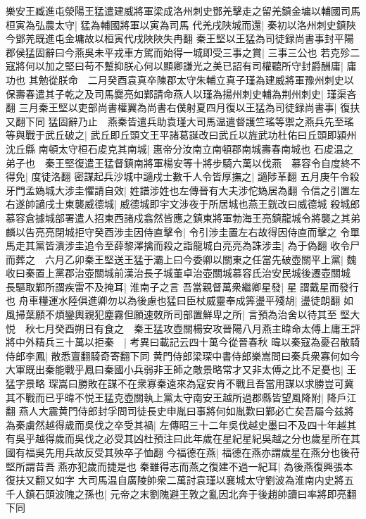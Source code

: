 樂安王臧進屯滎陽王猛遣建威將軍梁成洛州刺史鄧羌擊走之留羌鎮金墉以輔國司馬桓寅為弘農太守|{
	猛為輔國將軍以寅為司馬}
代羌戌陜城而還|{
	秦初以洛州刺史鎮陜今鄧羌既進屯金墉故以桓寅代戌陜陜失冉翻}
秦王堅以王猛為司徒録尚書事封平陽郡侯猛固辭曰今燕吳未平戎車方駕而始得一城即受三事之賞|{
	三事三公也}
若克殄二寇將何以加之堅曰苟不蹔抑朕心何以顯卿謙光之美已詔有司權聽所守封爵酬庸|{
	庸功也}
其勉從朕命　二月癸酉袁真卒陳郡太守朱輔立真子瑾為建威將軍豫州刺史以保壽春遣其子乾之及司馬爨亮如鄴請命燕人以瑾為揚州刺史輔為荆州刺史|{
	瑾渠吝翻}
三月秦王堅以吏部尚書權翼為尚書右僕射夏四月復以王猛為司徒録尚書事|{
	復扶又翻下同}
猛固辭乃止　燕秦皆遣兵助袁瑾大司馬温遣督護竺瑤等禦之燕兵先至瑤等與戰于武丘破之|{
	武丘即丘頭文王平諸葛誕改曰武丘以旌武功杜佑曰丘頭即潁州沈丘縣}
南頓太守桓石䖍克其南城|{
	惠帝分汝南立南頓郡南城壽春南城也}
石䖍温之弟子也　秦王堅復遣王猛督鎮南將軍楊安等十將步騎六萬以伐燕　慕容令自度終不得免|{
	度徒洛翻}
密謀起兵沙城中讁戍士數千人令皆厚撫之|{
	讁陟革翻}
五月庚午令殺牙門孟媯城大涉圭懼請自效|{
	姓譜涉姓也左傳晉有大夫涉佗媯居為翻}
令信之引置左右遂帥讁戌士東襲威德城|{
	威德城即宇文涉夜于所居城也燕王皝改曰威德城}
殺城郎慕容倉據城部署遣人招東西諸戍翕然皆應之鎮東將軍勃海王亮鎮龍城令將襲之其弟麟以告亮亮閉城拒守癸酉涉圭因侍直擊令|{
	令引涉圭置左右故得因侍直而擊之}
令單馬走其黨皆潰涉圭追令至薛黎澤擒而殺之詣龍城白亮亮為誅涉圭|{
	為于偽翻}
收令尸而葬之　六月乙卯秦王堅送王猛于灞上曰今委卿以關東之任當先破壺關平上黨|{
	魏收曰秦置上黨郡治壺關城前漢治長子城董卓治壺關城慕容氏治安民城後遷壺關城}
長驅取鄴所謂疾雷不及掩耳|{
	淮南子之言}
吾當親督萬衆繼卿星發|{
	星謂戴星而發行也}
舟車糧運水陸俱進卿勿以為後慮也猛曰臣杖威靈奉成筭盪平殘胡|{
	盪徒朗翻}
如風掃葉願不煩鑾輿親犯塵霧但願速敇所司部置鮮卑之所|{
	言預為治舍以待其至}
堅大悦　秋七月癸酉朔日有食之　秦王猛攻壺關楊安攻晉陽八月燕主暐命太傅上庸王評將中外精兵三十萬以拒秦　|{
	考異曰載記云四十萬今從晉春秋}
暐以秦寇為憂召散騎侍郎李鳳|{
	散悉亶翻騎奇寄翻下同}
黄門侍郎梁琛中書侍郎樂嵩問曰秦兵衆寡何如今大軍既出秦能戰乎鳳曰秦國小兵弱非王師之敵景略常才又非太傅之比不足憂也|{
	王猛字景略}
琛嵩曰勝敗在謀不在衆寡秦遠來為寇安肯不戰且吾當用謀以求勝豈可冀其不戰而已乎暐不悦王猛克壺關執上黨太守南安王越所過郡縣皆望風降附|{
	降戶江翻}
燕人大震黄門侍郎封孚問司徒長史申胤曰事將何如胤歎曰鄴必亡矣吾屬今兹將為秦虜然越得歲而吳伐之卒受其禍|{
	左傳昭三十二年吳伐越史墨曰不及四十年越其有吳乎越得歲而吳伐之必受其凶杜預注曰此年歲在星紀星紀吳越之分也歲星所在其國有福吳先用兵故反受其殃卒子恤翻}
今福德在燕|{
	福德在燕亦謂歲星在燕分也後苻堅所謂昔吾燕亦犯歲而捷是也}
秦雖得志而燕之復建不過一紀耳|{
	為後燕復興張本復扶又翻又如字}
大司馬温自廣陵帥衆二萬討袁瑾以襄城太守劉波為淮南内史將五千人鎮石頭波隗之孫也|{
	元帝之末劉隗避王敦之亂因北奔于後趙帥讀曰率將即亮翻下同}
